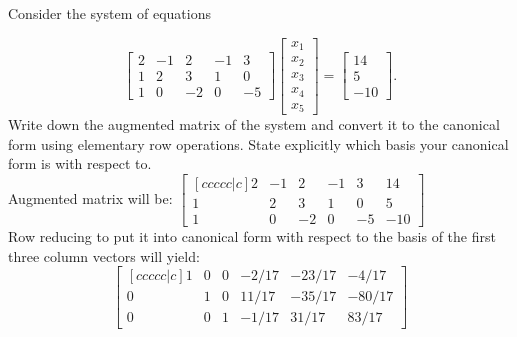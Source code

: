 \documentclass[12pt]{extarticle}
\theoremstyle{definition}
\begin{document}
\begin{problem} Consider the system of equations 

	\[\begin{bmatrix}
	2&-1&2&-1&3\\1&2&3&1&0\\1&0&-2&0&-5
	\end{bmatrix}\begin{bmatrix}
	x_1\\x_2\\x_3\\x_4\\x_5
	\end{bmatrix}=\begin{bmatrix}
	14\\5\\-10
	\end{bmatrix}.\]
	Write down the augmented matrix of the system and convert it to the canonical form using elementary row operations. State explicitly which basis your canonical form is with respect to.\\

	Augmented matrix will be: 
	$\begin{bmatrix}[ccccc|c]
	2&-1&2&-1&3&14\\1&2&3&1&0&5\\1&0&-2&0&-5&-10
	\end{bmatrix}$\\

	Row reducing to put it into canonical form with respect to the basis of the first three column vectors will yield: 
	$$\begin{bmatrix}[ccccc|c]
	1&0&0&-2/17&-23/17&-4/17\\0&1&0&11/17&-35/17&-80/17\\0&0&1&-1/17&31/17&83/17
	\end{bmatrix}$$

\end{problem}
\end{document}
